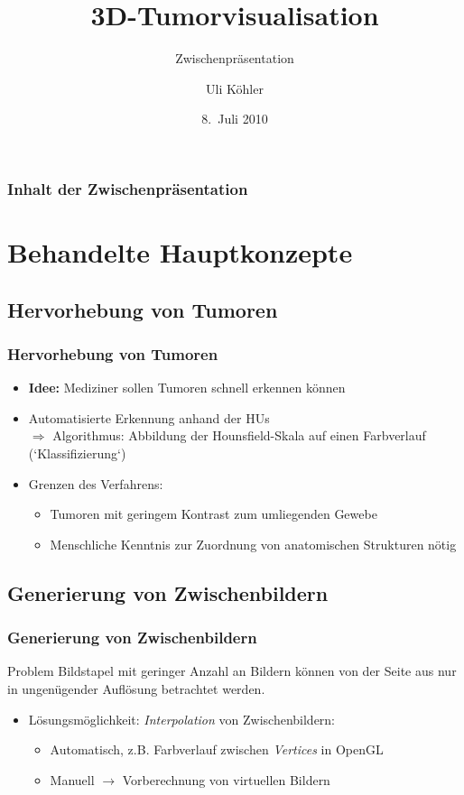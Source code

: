 \documentclass[14pt]{beamer}
\title{3D-Tumorvisualisation}
\subtitle{Zwischenpräsentation}
\author{Uli Köhler}
\institute[EMG]{Ernst-Mach-Gymnasium Haar}
\date{8.~Juli 2010}
\begin{document}
\frame{\titlepage}
\begin{frame}
\frametitle{Inhalt der Zwischenpräsentation}
\tableofcontents
\end{frame}
\section{Behandelte Hauptkonzepte}
\subsection{Hervorhebung von Tumoren}
\begin{frame}[allowframebreaks]
 \frametitle{Hervorhebung von Tumoren}
    \begin{itemize}
     \item \textbf{Idee:} Mediziner sollen Tumoren schnell erkennen können
     \item Automatisierte Erkennung anhand der HUs\\
	  $\Rightarrow$ Algorithmus: Abbildung der Hounsfield-Skala auf einen Farbverlauf (`Klassifizierung`)
     \item Grenzen des Verfahrens:
      \begin{itemize}
	\item Tumoren mit geringem Kontrast zum umliegenden Gewebe
	\item Menschliche Kenntnis zur Zuordnung von anatomischen Strukturen nötig
      \end{itemize}
    \end{itemize}
\end{frame}
\subsection{Generierung von Zwischenbildern}
\begin{frame}[allowframebreaks]
 \frametitle{Generierung von Zwischenbildern}
      \begin{block}{Problem}
	      Bildstapel mit geringer Anzahl an Bildern können von der Seite aus nur in ungenügender
	      Auflösung betrachtet werden.
      \end{block}
    \begin{itemize}
     \item Lösungsmöglichkeit: \textit{Interpolation} von Zwischenbildern:
      \begin{itemize}
	\item Automatisch, z.B. Farbverlauf zwischen \textit{Vertices} in OpenGL
	\item Manuell $\rightarrow$ Vorberechnung von virtuellen Bildern
      \end{itemize}
    \end{itemize}
\end{frame}
\end{document}
